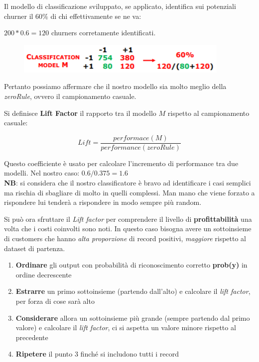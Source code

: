 Il modello di classificazione sviluppato, se applicato, identifica sui potenziali churner il $60\%$ di chi effettivamente se ne va: 

$200*0.6 = 120$ churners corretamente identificati.
\begin{figure}[H]
	\centering
	\includegraphics[height=0.1 \linewidth]{classification/pict/esChurnerModel.png}
\end{figure}
Pertanto possiamo affermare che il nostro modello sia molto meglio della \textit{zeroRule}, ovvero il campionamento casuale. 

\begin{defn}
	Si definisce \textbf{Lift Factor} il rapporto tra il modello $M$ rispetto al campionamento casuale:
	
	\[Lift = \frac{performace(M)}{performance(zeroRule)}\]
\end{defn}
Questo coefficiente è usato per calcolare l'incremento di performance tra due modelli.
Nel nostro caso: $0.6/0.375 = 1.6$\\

\textbf{NB}: si considera che il nostro classificatore è bravo ad identificare i casi semplici ma rischia di sbagliare di molto in quelli complessi. Man mano che viene forzato a rispondere lui tenderà a rispondere in modo sempre più random.

Si può ora sfruttare il \textit{Lift factor} per comprendere il livello di \textbf{profittabilità} una volta che i costi coinvolti sono noti. In questo caso bisogna avere un sottoinsieme di customers che hanno \textit{alta proporzione} di record positivi, \textit{maggiore} rispetto al dataset di partenza.

\begin{enumerate}
	\item \textbf{Ordinare} gli output con probabilità di riconoscimento corretto \textbf{prob(y)} in ordine decrescente
	\item \textbf{Estrarre} un primo sottoinsieme (partendo dall'alto) e calcolare il \textit{lift factor}, per forza di cose sarà alto
	\item \textbf{Considerare} allora un sottoinsieme più grande (sempre partendo dal primo valore) e calcolare il \textit{lift factor}, ci si aspetta un valore minore rispetto al precedente
	\item \textbf{Ripetere} il punto 3 finché si includono tutti i record
\end{enumerate} 

